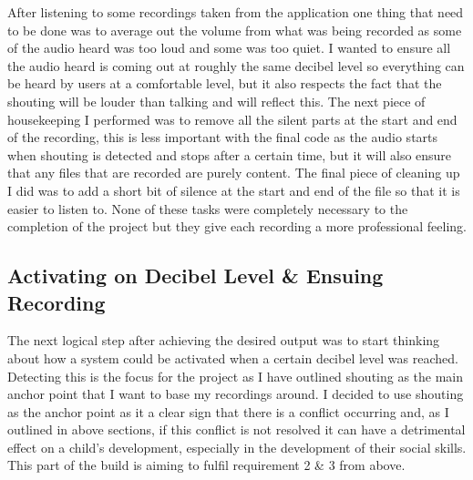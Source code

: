 \documentclass[a4paper,11pt]{report}
\begin{document}
After listening to some recordings taken from the application one thing that need to be done was to average out the volume from what was being recorded as some of the audio heard was too loud and some was too quiet. I wanted to ensure all the audio heard is coming out at roughly the same decibel level so everything can be heard by users at a comfortable level, but it also respects the fact that the shouting will be louder than talking and will reflect this. The next piece of housekeeping I performed was to remove all the silent parts at the start and end of the recording, this is less important with the final code as the audio starts when shouting is detected and stops after a certain time, but it will also ensure that any files that are recorded are purely content. The final piece of cleaning up I did was to add a short bit of silence at the start and end of the file so that it is easier to listen to. None of these tasks were completely necessary to the completion of the project but they give each recording a more professional feeling.

\subsection{Activating on Decibel Level \& Ensuing Recording}
The next logical step after achieving the desired output was to start thinking about how a system could be activated when a certain decibel level was reached. Detecting this is the focus for the project as I have outlined shouting as the main anchor point that I want to base my recordings around. I decided to use shouting as the anchor point as it a clear sign that there is a conflict occurring and, as I outlined in above sections, if this conflict is not resolved it can have a detrimental effect on a child’s development, especially in the development of their social skills. This part of the build is aiming to fulfil requirement 2 \& 3 from above.\\
\end{document}
